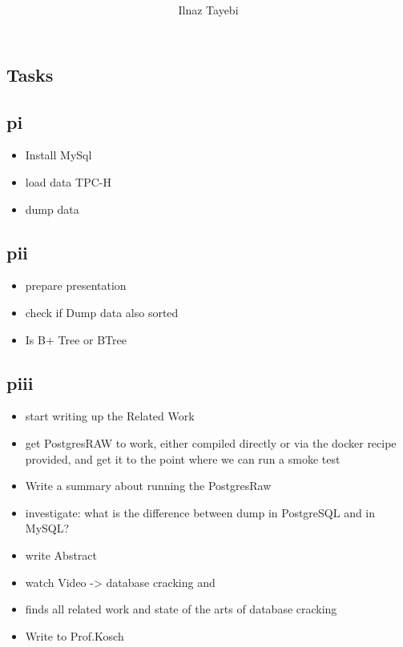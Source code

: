 \documentclass[sigconf,natbib=false]{acmart}
\begin{document}
\title{\begin{placeholder}\end{placeholder}}

\author{Ilnaz Tayebi}

\fancyfoot{}
\thispagestyle{empty}
\renewcommand\footnotetextcopyrightpermission[1]{}
\pagestyle{plain}


\begin{planning}

\section*{Tasks}

\subsection*{\acrlong{pi}}

\begin{itemize}
    \item Install MySql
    \item load data TPC-H
    \item dump data

\end{itemize}

\subsection*{\acrlong{pii}}
\begin{itemize}
    \item prepare presentation
    \item  check if Dump data also sorted
    \item Is B+ Tree or BTree    
\end{itemize}

\subsection*{\acrlong{piii}}
\begin{itemize}
    \item start writing up the Related Work
    \item  get PostgresRAW to work, either compiled directly or via the docker recipe provided, and get it to the point where we can run a smoke test
    \item Write a summary about running the PostgresRaw
    \item investigate: what is the difference between dump in PostgreSQL and in MySQL?
    \item write Abstract
    \item watch Video -> database cracking \cite{google_techtalks_database_2007} and \cite{microsoft_research_database_2016}
    \item finds all related work and state of the arts of database cracking
    \item Write to Prof.Kosch
\end{itemize}

\end{planning}
\end{document}
